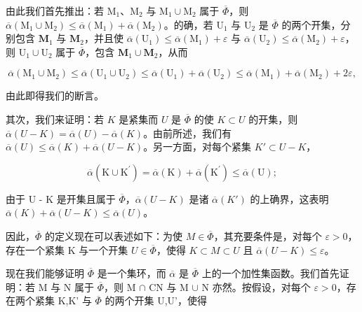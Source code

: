 由此我们首先推出：若 \(\mathrm{M}_1\)、\(\mathrm{M}_2\) 与 \(\mathrm{M}_1 \cup \mathrm{M}_2\) 属于 \(\overline{\Phi}\)，则 \(\overline{\alpha}(\mathrm{M}_1 \cup \mathrm{M}_2) \leqslant \overline{\alpha}(\mathrm{M}_1) + \overline{\alpha}(\mathrm{M}_2)\)。的确，若 \(\mathrm{U}_1\) 与 \(\mathrm{U}_2\) 是 \(\overline{\Phi}\) 的两个开集，分别包含 \(\mathbf{M}_1\) 与 \(\mathbf{M}_2\)，并且使 \(\overline{\alpha} (\mathrm{U}_1)\leqslant \overline{\alpha} (\mathrm{M}_1) + \varepsilon\) 与 \(\overline{\alpha} (\mathrm{U}_2)\leqslant \overline{\alpha} (\mathrm{M}_2) + \varepsilon\)，则 \(\mathrm{U}_1\cup \mathrm{U}_2\) 属于 \(\overline{\Phi}\)，包含 \(\mathbf{M}_1\cup \mathbf{M}_2\)，从而

\[
\overline {{\alpha}} \left(\mathrm{M} _ {1} \cup \mathrm{M} _ {2}\right) \leqslant \overline {{\alpha}} \left(\mathrm{U} _ {1} \cup \mathrm{U} _ {2}\right) \leqslant \overline {{\alpha}} \left(\mathrm{U} _ {1}\right) + \overline {{\alpha}} \left(\mathrm{U} _ {2}\right) \leqslant \overline {{\alpha}} \left(\mathrm{M} _ {1}\right) + \overline {{\alpha}} \left(\mathrm{M} _ {2}\right) + 2 \varepsilon ,
\]

由此即得我们的断言。

其次，我们来证明：若 \(K\) 是紧集而 \(U\) 是 \(\overline{\Phi}\) 的使 \(K \subset U\) 的开集，则 \(\overline{\alpha}(U - K) = \overline{\alpha}(U) - \overline{\alpha}(K)\)。由前所述，我们有 \(\overline{\alpha}(U) \leqslant \overline{\alpha}(K) + \overline{\alpha}(U - K)\)。另一方面，对每个紧集 \(K' \subset U - K\)，

\[
\overline {{{{\alpha}}}} (\mathrm{K} \cup \mathrm{K} ^ {\prime}) = \overline {{{{\alpha}}}} (\mathrm{K}) + \overline {{{{\alpha}}}} (\mathrm{K} ^ {\prime}) \leqslant \overline {{{{\alpha}}}} (\mathrm{U});
\]

由于 U - K 是开集且属于 \(\overline{\Phi}\)，\(\overline{\alpha}(U - K)\) 是诸 \(\overline{\alpha}(K')\) 的上确界，这表明 \(\overline{\alpha}(K) + \overline{\alpha}(U - K) \leqslant \overline{\alpha}(U)\)。

因此，\(\overline{\Phi}\) 的定义现在可以表述如下：为使 \(M \in \overline{\Phi}\)，其充要条件是，对每个 \(\varepsilon > 0\)，存在一个紧集 K 与一个开集 \(U \in \overline{\Phi}\)，使得 \(K \subset M \subset U\) 且 \(\overline{\alpha}(U - K) \leqslant \varepsilon\)。

现在我们能够证明 \(\overline{\Phi}\) 是一个集环，而 \(\overline{\alpha}\) 是 \(\overline{\Phi}\) 上的一个加性集函数。我们首先证明：若 M 与 N 属于 \(\overline{\Phi}\)，则 M \(\cap\) CN 与 M \(\cup\) N 亦然。按假设，对每个 \(\varepsilon > 0\)，存在两个紧集 K,K' 与 \(\overline{\Phi}\) 的两个开集 U,U'，使得

